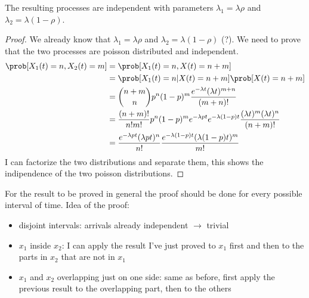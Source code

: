 \begin{itemize}
\begin{figure}[H]
                  \end{figure}
            The resulting processes are independent with parameters $\lambda_1=\lambda \rho$ and $\lambda_2 = \lambda (1 - \rho)$.
            \begin{proof}
              We already know that $\lambda_1 = \lambda \rho$ and $\lambda_2 = \lambda (1 - \rho)$ (?).  We need to prove that the two processes are poisson distributed and independent.
              \begin{equation}
                \begin{split}
                  \prob[X_1(t) = n, X_2(t)=m] &= \prob[X_1(t)=n, X(t)= n +m] \\
                  &= \prob[X_1(t)=n | X(t)=n+m]\prob[X(t)=n+m]\\
                  &= {{n+m}\choose{n}}p^n(1-p)^m \frac{e^{-\lambda t}(\lambda t)^{m+n}}{(m+n)!}\\
                  &= \frac{(n+m)!}{n!m!}p^n(1-p)^m e^{-\lambda p t}e^{-\lambda (1-p)t}\frac{(\lambda t)^m (\lambda t)^n}{(n+m)!}\\
                  &= \frac{e^{-\lambda p t}(\lambda p t)^n}{n!}\frac{e^{-\lambda (1-p) t}(\lambda (1-p) t)^m}{m!}
                \end{split}
              \end{equation}
              I can factorize the two distributions and separate them, this shows the indipendence of the two poisson distributions.
            \end{proof}
            For the result to be proved in general the proof should be done for every possible interval of time. Idea of the proof:
            \begin{itemize}
              \item disjoint intervals: arrivals already independent $\rightarrow$ trivial
              \item $x_1$ inside $x_2$: I can apply the result I've just proved to $x_1$ first and then to the parts in $x_2$ that are not in $x_1$
              \item $x_1$ and $x_2$ overlapping just on one side: same as before, first apply the previous result to the overlapping part, then to the others
            \end{itemize}



  \end{itemize}

